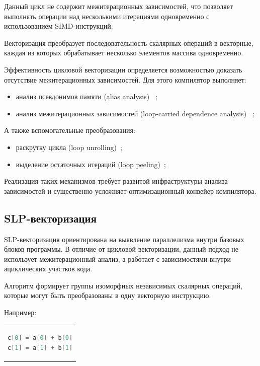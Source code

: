 Данный цикл не содержит межитерационных зависимостей, что позволяет выполнять операции над несколькими итерациями одновременно с использованием SIMD-инструкций.

Векторизация преобразует последовательность скалярных операций в векторные, 
каждая из которых обрабатывает несколько элементов массива одновременно. 

Эффективность цикловой векторизации определяется возможностью доказать отсутствие межитерационных зависимостей. Для этого компилятор выполняет:
\begin{itemize}
    \item анализ псевдонимов памяти (alias analysis) ~\cite{diwan1998type, gcc_alias};
    \item анализ межитерационных зависимостей (loop-carried dependence analysis) ~\cite{devan_loop_dependence};
\end{itemize}

А также вспомогательные преобразования:
\begin{itemize}
    \item раскрутку цикла (loop unrolling)~\cite{aho2006compilers, davidson2001aggressive};
    \item выделение остаточных итераций (loop peeling)~\cite{callahan1988peeling};
\end{itemize}

Реализация таких механизмов требует развитой инфраструктуры анализа зависимостей и существенно усложняет оптимизационный конвейер компилятора.

\subsection{SLP-векторизация}

SLP-векторизация ориентирована на выявление параллелизма внутри базовых блоков программы. 
В отличие от цикловой векторизации, данный подход не использует межитерационный анализ, а работает с зависимостями внутри ациклических участков кода.

Алгоритм формирует группы изоморфных независимых скалярных операций, которые могут быть преобразованы в одну векторную инструкцию.

Например:

\begin{center}
\begin{tabular}{c}
\begin{lstlisting}[language=Go, captionpos=b]
c[0] = a[0] + b[0]
c[1] = a[1] + b[1]
\end{lstlisting}
\end{tabular}
\end{center}


